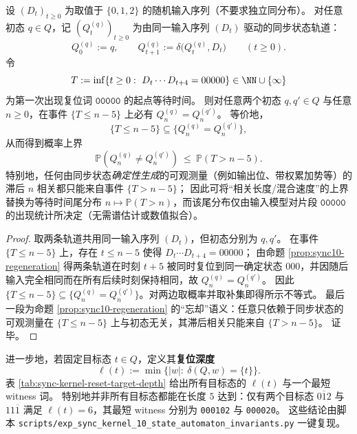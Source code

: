 \begin{corollary}\label{cor:sync10-regeneration-correlation-bound}
设 \((D_t)_{t\ge 0}\) 为取值于 \(\{0,1,2\}\) 的随机输入序列（不要求独立同分布）。
对任意初态 \(q\in Q\)，记 \((Q^{(q)}_t)_{t\ge 0}\) 为由同一输入序列 \((D_t)\) 驱动的同步状态轨道：
\[
Q^{(q)}_0:=q,\qquad Q^{(q)}_{t+1}:=\delta\!\bigl(Q^{(q)}_t,D_t\bigr)\qquad(t\ge 0).
\]
令
\[
T:=\inf\{t\ge 0:\ D_t\cdots D_{t+4}=00000\}\in\NN\cup\{\infty\}
\]
为第一次出现复位词 \(\texttt{00000}\) 的起点等待时间。
则对任意两个初态 \(q,q'\in Q\) 与任意 \(n\ge 0\)，在事件 \(\{T\le n-5\}\) 上必有 \(Q^{(q)}_n=Q^{(q')}_n\)。
等价地，
\[
\{T\le n-5\}\subseteq \{Q^{(q)}_n=Q^{(q')}_n\},
\]
从而得到概率上界
\[
\mathbb{P}\!\left(Q^{(q)}_n\neq Q^{(q')}_n\right)\ \le\ \mathbb{P}(T>n-5).
\]
特别地，任何由同步状态\emph{确定性生成}的可观测量（例如输出位、带权累加势等）的滞后 \(n\) 相关都只能来自事件 \(\{T>n-5\}\)；
因此可将“相关长度/混合速度”的上界替换为等待时间尾分布 \(n\mapsto \mathbb{P}(T>n)\)，而该尾分布仅由输入模型对片段 \(\texttt{00000}\) 的出现统计所决定（无需谱估计或数值拟合）。
\end{corollary}
\begin{proof}
取两条轨道共用同一输入序列 \((D_t)\)，但初态分别为 \(q,q'\)。
在事件 \(\{T\le n-5\}\) 上，存在 \(t\le n-5\) 使得 \(D_t\cdots D_{t+4}=00000\)；
由命题 \ref{prop:sync10-regeneration} 得两条轨道在时刻 \(t+5\) 被同时复位到同一确定状态 \(000\)，并因随后输入完全相同而在所有后续时刻保持相同，故 \(Q^{(q)}_n=Q^{(q')}_n\)。
因此 \(\{T\le n-5\}\subseteq \{Q^{(q)}_n=Q^{(q')}_n\}\)。对两边取概率并取补集即得所示不等式。
最后一段为命题 \ref{prop:sync10-regeneration} 的“忘却”语义：任意只依赖于同步状态的可观测量在 \(\{T\le n-5\}\) 上与初态无关，其滞后相关只能来自 \(\{T>n-5\}\)。
证毕。
\end{proof}

进一步地，若固定目标态 $t\in Q$，定义其\textbf{复位深度}
\[
\ell(t):=\min\{|w|:\ \delta(Q,w)=\{t\}\}.
\]
表 \ref{tab:sync-kernel-reset-target-depth} 给出所有目标态的 $\ell(t)$ 与一个最短 witness 词。
特别地并非所有目标态都能在长度 $5$ 达到：仅有两个目标态 $0\overline{1}2$ 与 $11\overline{1}$ 满足 $\ell(t)=6$，其最短 witness 分别为 \texttt{000102} 与 \texttt{000020}。
这些结论由脚本 \texttt{scripts/exp\_sync\_kernel\_10\_state\_automaton\_invariants.py} 一键复现。



